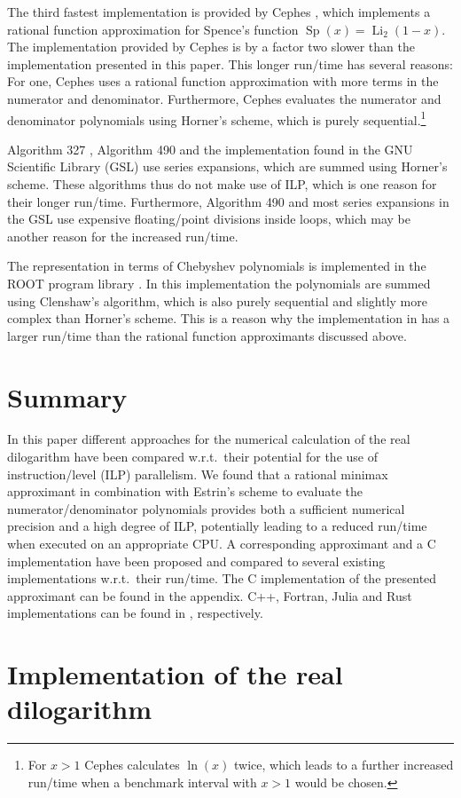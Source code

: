 \documentclass[10pt,DIV16,twocolumn,numbers=noenddot]{scrartcl}
\newcommand{\Li}{\operatorname{Li}_2}
\begin{document}
The third fastest implementation is provided by Cephes \cite{cephes},
which implements a rational function approximation for Spence's
function $\operatorname{Sp}(x)=\Li(1-x)$.  The implementation provided
by Cephes is by a factor two slower than the implementation presented
in this paper.  This longer run\-/time has several reasons: For one,
Cephes uses a rational function approximation with more terms in the
numerator and denominator.  Furthermore, Cephes evaluates the
numerator and denominator polynomials using Horner's scheme, which is
purely sequential.\footnote{For $x>1$ Cephes calculates $\ln(x)$
  twice, which leads to a further increased run\-/time when a
  benchmark interval with $x>1$ would be chosen.}

Algorithm 327 \cite{koelbigDilog}, Algorithm 490 \cite{ginsberg} and
the implementation found in the GNU Scientific Library (GSL)
\cite{gsl} use series expansions, which are summed using Horner's
scheme.  These algorithms thus do not make use of ILP, which is one
reason for their longer run\-/time.  Furthermore, Algorithm 490 and
most series expansions in the GSL use expensive floating\-/point
divisions inside loops, which may be another reason for the increased
run\-/time.

The representation in terms of Chebyshev polynomials \cite{luke} is
implemented in the ROOT program library \cite{root}.  In this
implementation the polynomials are summed using Clenshaw's algorithm,
which is also purely sequential and slightly more complex than
Horner's scheme.  This is a reason why the implementation in
\cite{root} has a larger run\-/time than the rational function
approximants discussed above.

\section{Summary}

In this paper different approaches for the numerical calculation of
the real dilogarithm have been compared w.r.t.\ their potential for
the use of instruction\-/level (ILP) parallelism.  We found that a
rational minimax approximant in combination with Estrin's scheme to
evaluate the numerator/denominator polynomials provides both a
sufficient numerical precision and a high degree of ILP, potentially
leading to a reduced run\-/time when executed on an appropriate CPU.
A corresponding approximant and a C implementation have been proposed
and compared to several existing implementations w.r.t.\ their
run\-/time.  The C implementation of the presented approximant can be
found in the appendix.  C++, Fortran, Julia and Rust implementations
can be found in \cite{polylogarithm,PolyLog.jl,polylog}, respectively.

\appendix

\section{Implementation of the real dilogarithm}



\printbibliography
\end{document}
